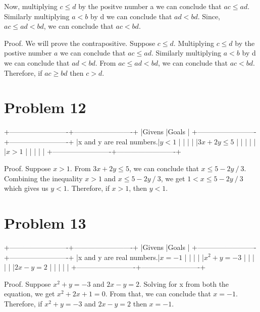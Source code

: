 \documentclass{article}
\begin{document}
Now, multiplying $c \leq d$ by the positve number a we can conclude
that $ac \leq ad$. Similarly multiplying $a < b$ by d we can conclude
that $ad < bd$. Since, $ac \leq ad < bd$, we can conclude that $ac <
bd$.

Proof. We will prove the contrapositive. Suppose $c \leq d$.
Multiplying $c \leq d$ by the postive number $a$ we can conclude that
$ac \leq ad$. Similarly multiplying $a < b$ by d we can conclude that
$ad < bd$. From $ac \leq ad < bd$, we can conclude that $ac < bd$.
Therefore, if $ac \geq bd$ then $c > d$.

\section{Problem 12}

+-------------------------+-------------------------+
|Givens                   |Goals                    |
+-------------------------+-------------------------+
|x and y are real numbers.|$ y < 1$                 |
|                         |                         |
|$3x + 2y \leq 5$         |                         |
|                         |                         |
|$x > 1$                  |                         |
|                         |                         |
+-------------------------+-------------------------+

Proof. Suppose $x > 1$. From $3x + 2y \leq 5$, we can conclude that $x
\leq 5 - 2y \mathbin{/} 3$. Combining the inequality $x > 1$ and $x \leq 5 - 2y
\mathbin{/} 3$, we get $1 < x \leq 5 - 2y \mathbin{/}3$ which gives us $y < 1$. Therefore,
if $x > 1$, then $y < 1$.

\section{Problem 13}
+-------------------------+-------------------------+
|Givens                   |Goals                    |
+-------------------------+-------------------------+
|x and y are real numbers.|$ x = -1$                |
|                         |                         |
|$x^2 + y = -3$           |                         |
|                         |                         |
|$2x - y = 2$             |                         |
|                         |                         |
+-------------------------+-------------------------+

Proof. Suppose $x^2 + y = -3$ and $2x - y = 2$. Solving for x from
both the equation, we get $x^2 + 2x + 1 =0$. From that, we can
conclude that $x = -1$. Therefore, if $x^2 + y = -3$ and $2x - y = 2$
then $x = -1$.
\end{document}
